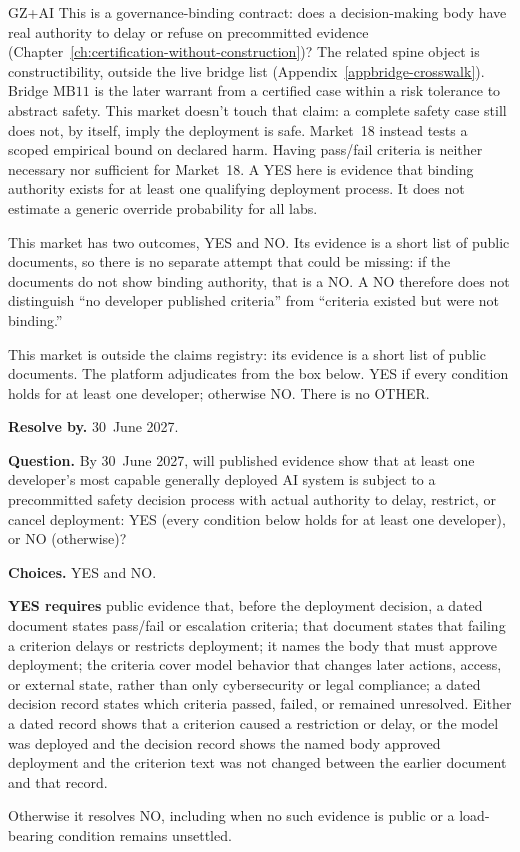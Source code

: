 \begin{authbar}{GZ+AI}
This is a governance-binding contract: does a decision-making body have real authority to delay or refuse on precommitted evidence (Chapter~\ref{ch:certification-without-construction})?
The related spine object is constructibility, outside the live bridge list (Appendix~\ref{appbridge-crosswalk}).
Bridge \(\text{MB11}\) is the later warrant from a certified case within a risk tolerance to abstract safety.
This market doesn't touch that claim: a complete safety case still does not, by itself, imply the deployment is safe.
Market~18 instead tests a scoped empirical bound on declared harm.
Having pass/fail criteria is neither necessary nor sufficient for Market~18.
A YES here is evidence that binding authority exists for at least one qualifying deployment process.
It does not estimate a generic override probability for all labs.

This market has two outcomes, YES and NO.
Its evidence is a short list of public documents, so there is no separate attempt that could be missing: if the documents do not show binding authority, that is a NO.
A NO therefore does not distinguish ``no developer published criteria'' from ``criteria existed but were not binding.''

This market is outside the claims registry: its evidence is a short list of public documents. The platform adjudicates from the box below. YES if every condition holds for at least one developer; otherwise NO. There is no OTHER.
\end{authbar}
\begin{predictionbox}
\textbf{Resolve by.} 30~June 2027.

\textbf{Question.}
By 30~June 2027, will published evidence show that at least one developer's most capable generally deployed AI system is subject to a precommitted safety decision process with actual authority to delay, restrict, or cancel deployment: YES (every condition below holds for at least one developer), or NO (otherwise)?

\textbf{Choices.} YES and NO.
\end{predictionbox}
\begin{predictionresolution}
\textbf{YES requires} public evidence that, before the deployment decision, a dated document states pass/fail or escalation criteria; that document states that failing a criterion delays or restricts deployment; it names the body that must approve deployment; the criteria cover model behavior that changes later actions, access, or external state, rather than only cybersecurity or legal compliance; a dated decision record states which criteria passed, failed, or remained unresolved.
Either a dated record shows that a criterion caused a restriction or delay, or the model was deployed and the decision record shows the named body approved deployment and the criterion text was not changed between the earlier document and that record.

Otherwise it resolves NO, including when no such evidence is public or a load-bearing condition remains unsettled.
\end{predictionresolution}
